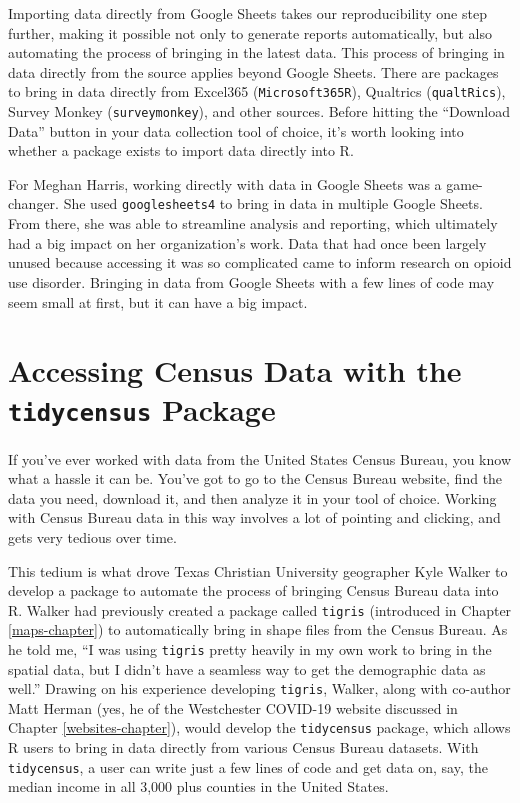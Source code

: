\documentclass[
]{book}
\begin{document}
Importing data directly from Google Sheets takes our reproducibility one step further, making it possible not only to generate reports automatically, but also automating the process of bringing in the latest data. This process of bringing in data directly from the source applies beyond Google Sheets. There are packages to bring in data directly from Excel365 (\texttt{Microsoft365R}), Qualtrics (\texttt{qualtRics}), Survey Monkey (\texttt{surveymonkey}), and other sources. Before hitting the ``Download Data'' button in your data collection tool of choice, it's worth looking into whether a package exists to import data directly into R.

For Meghan Harris, working directly with data in Google Sheets was a game-changer. She used \texttt{googlesheets4} to bring in data in multiple Google Sheets. From there, she was able to streamline analysis and reporting, which ultimately had a big impact on her organization's work. Data that had once been largely unused because accessing it was so complicated came to inform research on opioid use disorder. Bringing in data from Google Sheets with a few lines of code may seem small at first, but it can have a big impact.

\hypertarget{accessing-census-data-with-the-tidycensus-package}{%
\section*{\texorpdfstring{Accessing Census Data with the \texttt{tidycensus} Package}{Accessing Census Data with the tidycensus Package}}\label{accessing-census-data-with-the-tidycensus-package}}

If you've ever worked with data from the United States Census Bureau, you know what a hassle it can be. You've got to go to the Census Bureau website, find the data you need, download it, and then analyze it in your tool of choice. Working with Census Bureau data in this way involves a lot of pointing and clicking, and gets very tedious over time.

This tedium is what drove Texas Christian University geographer Kyle Walker to develop a package to automate the process of bringing Census Bureau data into R. Walker had previously created a package called \texttt{tigris} (introduced in Chapter \ref{maps-chapter}) to automatically bring in shape files from the Census Bureau. As he told me, ``I was using \texttt{tigris} pretty heavily in my own work to bring in the spatial data, but I didn't have a seamless way to get the demographic data as well.'' Drawing on his experience developing \texttt{tigris}, Walker, along with co-author Matt Herman (yes, he of the Westchester COVID-19 website discussed in Chapter \ref{websites-chapter}), would develop the \texttt{tidycensus} package, which allows R users to bring in data directly from various Census Bureau datasets. With \texttt{tidycensus}, a user can write just a few lines of code and get data on, say, the median income in all 3,000 plus counties in the United States.
\end{document}
